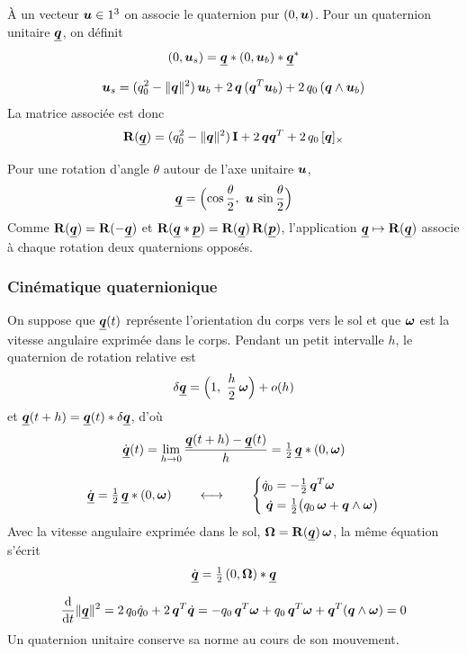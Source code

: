 À un vecteur $\bm{u}\in1^3$ on associe le quaternion pur
$(0,\bm{u})$. Pour un quaternion unitaire $\underline{\bm{q}}$, on définit
\[
    (0,\bm{u}_s) = \underline{\bm{q}}\ast(0,\bm{u}_b)\ast\underline{\bm{q}}^*
\]

\begin{proposition}
    \[
        \bm{u}_s = (q_0^2 - \|\bm{q}\|^2)\,\bm{u}_b
        + 2\,\bm{q}\,(\bm{q}^T\bm{u}_b)
        + 2\,q_0\,(\bm{q}\wedge\bm{u}_b)
    \]
    La matrice associée est donc
    \[
        \mathbf{R}(\underline{\bm{q}}) = (q_0^2 - \|\bm{q}\|^2)\,\mathbf{I}
        + 2\,\bm{q}\bm{q}^T + 2\,q_0\,[\bm{q}]_{\times}
    \]
\end{proposition}

Pour une rotation d'angle $\theta$ autour de l'axe unitaire $\bm{u}$,
\[
    \underline{\bm{q}} = \Bigl(\cos\frac{\theta}{2},\
    \bm{u}\,\sin\frac{\theta}{2}\Bigr)
\]
Comme $\mathbf{R}(\underline{\bm{q}}) = \mathbf{R}(-\underline{\bm{q}})$ et
$\mathbf{R}(\underline{\bm{q}}\ast\underline{\bm{p}})
= \mathbf{R}(\underline{\bm{q}})\,\mathbf{R}(\underline{\bm{p}})$, l'application
$\underline{\bm{q}}\mapsto\mathbf{R}(\underline{\bm{q}})$ associe à chaque rotation deux
quaternions opposés.

\subsubsection{Cinématique quaternionique}

On suppose que $\underline{\bm{q}}(t)$ représente l'orientation du corps vers le
sol et que $\bm{\omega}$ est la vitesse angulaire exprimée dans le
corps. Pendant un petit intervalle $h$, le quaternion de rotation
relative est
\[
    \delta\quat{q} = \Bigl(1,\ \frac{h}{2}\,\vect{\omega}\Bigr) + o(h)
\]
et $\underline{\bm{q}}(t+h) = \underline{\bm{q}}(t)\ast\delta\underline{\bm{q}}$, d'où
\[
    \dot{\underline{\bm{q}}}(t)
    = \lim_{h\to 0}\frac{\underline{\bm{q}}(t+h) - \underline{\bm{q}}(t)}{h}
    = \tfrac12\,\underline{\bm{q}}\ast(0,\bm{\omega})
\]

\begin{proposition}
    \[
        \dot{\underline{\bm{q}}} = \tfrac12\,\underline{\bm{q}}\ast(0,\bm{\omega})
        \qquad\longleftrightarrow\qquad
        \left\{
        \begin{aligned}
            \dot q_0 &= -\tfrac12\,\bm{q}^T\bm{\omega}\\
            \dot{\bm{q}} &= \tfrac12\bigl(q_0\,\bm{\omega}
            + \bm{q}\wedge\bm{\omega}\bigr)
        \end{aligned}
        \right.
    \]
    Avec la vitesse angulaire exprimée dans le sol,
    $\bm{\Omega} = \mathbf{R}(\underline{\bm{q}})\,\bm{\omega}$, la même
    équation s'écrit
    \[
        \dot{\underline{\bm{q}}} = \tfrac12\,(0,\bm{\Omega})\ast\underline{\bm{q}}
    \]
\end{proposition}

\begin{proposition}
    \[
        \frac{\mathrm{d}}{\mathrm{d} t}\|\underline{\bm{q}}\|^2
        = 2\,q_0\dot q_0 + 2\,\bm{q}^T\dot{\bm{q}}
        = -q_0\,\bm{q}^T\bm{\omega} + q_0\,\bm{q}^T\bm{\omega}
        + \bm{q}^T(\bm{q}\wedge\bm{\omega}) = 0
    \]
    Un quaternion unitaire conserve sa norme au cours de son mouvement.
\end{proposition}
